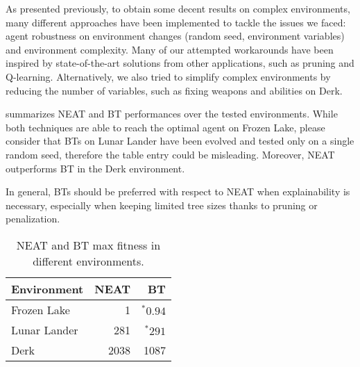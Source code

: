 
As presented previously, to obtain some decent results on complex environments, many different approaches have been implemented to tackle the issues we faced: agent robustness on environment changes (random seed, environment variables) and environment complexity. Many of our attempted workarounds have been inspired by state-of-the-art solutions from other applications, such as pruning and Q-learning. Alternatively, we also tried to simplify complex environments by reducing the number of variables, such as fixing weapons and abilities on Derk.

 summarizes NEAT and BT performances over the tested environments. While both techniques are able to reach the optimal agent on Frozen Lake, please consider that BTs on Lunar Lander have been evolved and tested only on a single random seed, therefore the table entry could be misleading. Moreover, NEAT outperforms BT in the Derk environment.

In general, BTs should be preferred with respect to NEAT when explainability is necessary, especially when keeping limited tree sizes thanks to pruning or penalization.

\begin{table}[t]
    \caption{NEAT and BT max fitness in different environments.}
    \begin{center}
        \begin{tabular}{lrr}
            \toprule
            Environment & NEAT & BT \\
            \midrule
            Frozen Lake  & 1    &  \(^* 0.94\) \\
            Lunar Lander & 281  & \(^* 291\) \\
            Derk         & 2038 & 1087 \\
            \bottomrule
        \end{tabular}
    \end{center}
    \label{tab:neat-vs-bt}
\end{table}